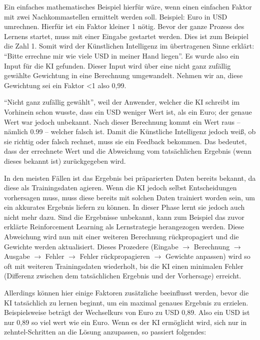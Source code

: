 Ein einfaches mathematisches Beispiel hierfür wäre, wenn einen einfachen Faktor mit zwei Nachkommastellen ermittelt werden soll. Beispiel: Euro in USD umrechnen. Hierfür ist ein Faktor kleiner 1 nötig. Bevor der ganze Prozess des Lernens startet, muss mit einer Eingabe gestartet werden. Dies ist zum Beispiel die Zahl 1. Somit wird der Künstlichen Intelligenz im übertragenen Sinne erklärt: ``Bitte errechne mir wie viele USD in meiner Hand liegen''. Es wurde also ein Input für die KI gefunden. Dieser Input wird über eine nicht ganz zufällig gewählte Gewichtung in eine Berechnung umgewandelt. Nehmen wir an, diese Gewichtung sei ein Faktor <1 also 0,99.

``Nicht ganz zufällig gewählt'', weil der Anwender, welcher die KI schreibt im Vorhinein schon wusste, dass ein USD weniger Wert ist, als ein Euro; der genaue Wert war jedoch unbekannt. Nach dieser Berechnung kommt ein Wert raus – nämlich 0.99 – welcher falsch ist. Damit die Künstliche Intelligenz jedoch weiß, ob sie richtig oder falsch rechnet, muss sie ein Feedback bekommen. Das bedeutet, dass der errechnete Wert und die Abweichung vom tatsächlichen Ergebnis (wenn dieses bekannt ist) zurückgegeben wird.

In den meisten Fällen ist das Ergebnis bei präparierten Daten bereits bekannt, da diese als Trainingsdaten agieren. Wenn die KI jedoch selbst Entscheidungen vorhersagen muss, muss diese bereits mit solchen Daten trainiert worden sein, um ein akkurates Ergebnis liefern zu können. In dieser Phase lernt sie jedoch auch nicht mehr dazu. Sind die Ergebnisse unbekannt, kann zum Beispiel das zuvor erklärte Reinforcement Learning als Lernstrategie herangezogen werden. Diese Abweichung wird nun mit einer weiteren Berechnung rückpropagiert und die Gewichte werden aktualisiert. Dieses Prozedere (Eingabe $\rightarrow$ Berechnung $\rightarrow$ Ausgabe $\rightarrow$ Fehler $\rightarrow$ Fehler rückpropagieren $\rightarrow$ Gewichte anpassen) wird so oft mit weiteren Trainingsdaten wiederholt, bis die KI einen minimalen Fehler (Differenz zwischen dem tatsächlichen Ergebnis und der Vorhersage) erreicht.

Allerdings können hier einige Faktoren zusätzliche beeinflusst werden, bevor die KI tatsächlich zu lernen beginnt, um ein maximal genaues Ergebnis zu erzielen. Beispielsweise beträgt der Wechselkurs von Euro zu USD 0,89. Also ein USD ist nur 0,89 so viel wert wie ein Euro. Wenn es der KI ermöglicht wird, sich nur in zehntel-Schritten an die Lösung anzupassen, so passiert folgendes:

